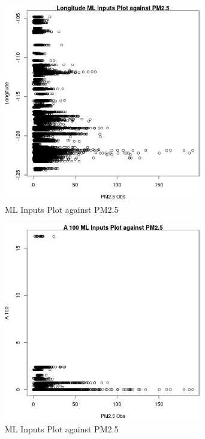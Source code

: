 \begin{figure} 
\centering  
\includegraphics[width=0.77\textwidth]{Code_Outputs/Report_ML_input_PM25_Step4_part_e_de_duplicated_aves_LongitudevPM25_Obs.jpg} 
\caption{\label{fig:Report_ML_input_PM25_Step4_part_e_de_duplicated_avesLongitudevPM25_Obs}ML Inputs Plot against PM2.5} 
\end{figure} 
 

\begin{figure} 
\centering  
\includegraphics[width=0.77\textwidth]{Code_Outputs/Report_ML_input_PM25_Step4_part_e_de_duplicated_aves_A_100vPM25_Obs.jpg} 
\caption{\label{fig:Report_ML_input_PM25_Step4_part_e_de_duplicated_avesA_100vPM25_Obs}ML Inputs Plot against PM2.5} 
\end{figure} 
 

